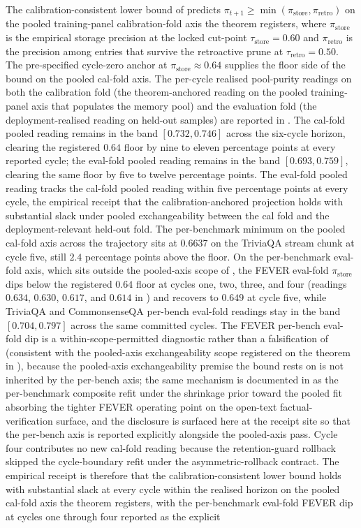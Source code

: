 The calibration-consistent lower bound of  predicts $\pi_{t+1} \ge \min(\pi_{\text{store}}, \pi_{\text{retro}})$ on the pooled training-panel calibration-fold axis the theorem registers, where $\pi_{\text{store}}$ is the empirical storage precision at the locked cut-point $\tau_{\text{store}} = 0.60$ and $\pi_{\text{retro}}$ is the precision among entries that survive the retroactive prune at $\tau_{\text{retro}} = 0.50$. The pre-specified cycle-zero anchor at $\pi_{\text{store}} \approx 0.64$ supplies the floor side of the bound on the pooled cal-fold axis. The per-cycle realised pool-purity readings on both the calibration fold (the theorem-anchored reading on the pooled training-panel axis that populates the memory pool) and the evaluation fold (the deployment-realised reading on held-out samples) are reported in . The cal-fold pooled reading remains in the band $[0.732, 0.746]$ across the six-cycle horizon, clearing the registered $0.64$ floor by nine to eleven percentage points at every reported cycle; the eval-fold pooled reading remains in the band $[0.693, 0.759]$, clearing the same floor by five to twelve percentage points. The eval-fold pooled reading tracks the cal-fold pooled reading within five percentage points at every cycle, the empirical receipt that the calibration-anchored projection holds with substantial slack under pooled exchangeability between the cal fold and the deployment-relevant held-out fold. The per-benchmark minimum on the pooled cal-fold axis across the trajectory sits at $0.6637$ on the TriviaQA stream chunk at cycle five, still $2.4$ percentage points above the floor. On the per-benchmark eval-fold axis, which sits outside the pooled-axis scope of , the FEVER eval-fold $\pi_{\text{store}}$ dips below the registered $0.64$ floor at cycles one, two, three, and four (readings $0.634$, $0.630$, $0.617$, and $0.614$ in ) and recovers to $0.649$ at cycle five, while TriviaQA and CommonsenseQA per-bench eval-fold readings stay in the band $[0.704, 0.797]$ across the same committed cycles. The FEVER per-bench eval-fold dip is a within-scope-permitted diagnostic rather than a falsification of  (consistent with the pooled-axis exchangeability scope registered on the theorem in ), because the pooled-axis exchangeability premise the bound rests on is not inherited by the per-bench axis; the same mechanism is documented in  as the per-benchmark composite refit under the shrinkage prior toward the pooled fit absorbing the tighter FEVER operating point on the open-text factual-verification surface, and the disclosure is surfaced here at the receipt site so that the per-bench axis is reported explicitly alongside the pooled-axis pass. Cycle four contributes no new cal-fold reading because the retention-guard rollback skipped the cycle-boundary refit under the asymmetric-rollback contract. The empirical receipt is therefore that the calibration-consistent lower bound holds with substantial slack at every cycle within the realised horizon on the pooled cal-fold axis the theorem registers, with the per-benchmark eval-fold FEVER dip at cycles one through four reported as the explicit 